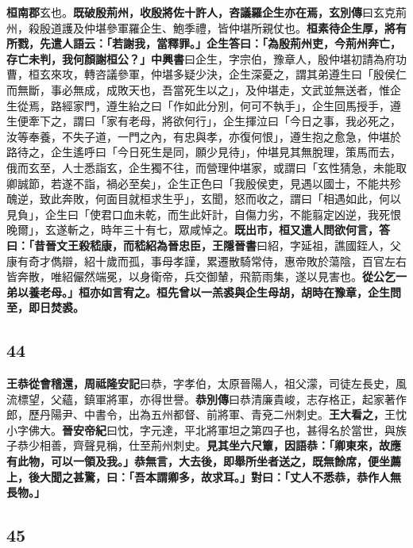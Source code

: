 \textbf{桓南郡}{\footnotesize 玄也。}\textbf{既破殷荊州，收殷將佐十許人，咨議羅企生亦在焉，}{\footnotesize \textbf{玄別傳}曰玄克荊州，殺殷道護及仲堪參軍羅企生、鮑季禮，皆仲堪所親仗也。}\textbf{桓素待企生厚，將有所戮，先遣人語云：「若謝我，當釋罪。」企生答曰：「為殷荊州吏，今荊州奔亡，存亡未判，我何顏謝桓公？」}{\footnotesize \textbf{中興書}曰企生，字宗伯，豫章人，殷仲堪初請為府功曹，桓玄來攻，轉咨議參軍，仲堪多疑少決，企生深憂之，謂其弟遵生曰「殷侯仁而無斷，事必無成，成敗天也，吾當死生以之」，及仲堪走，文武並無送者，惟企生從焉，路經家門，遵生紿之曰「作如此分別，何可不執手」，企生回馬授手，遵生便牽下之，謂曰「家有老母，將欲何行」，企生揮泣曰「今日之事，我必死之，汝等奉養，不失子道，一門之內，有忠與孝，亦復何恨」，遵生抱之愈急，仲堪於路待之，企生遙呼曰「今日死生是同，願少見待」，仲堪見其無脫理，策馬而去，俄而玄至，人士悉詣玄，企生獨不往，而營理仲堪家，或謂曰「玄性猜急，未能取卿誠節，若遂不詣，禍必至矣」，企生正色曰「我殷侯吏，見遇以國士，不能共殄醜逆，致此奔敗，何面目就桓求生乎」，玄聞，怒而收之，謂曰「相遇如此，何以見負」，企生曰「使君口血未乾，而生此奸計，自傷力劣，不能翦定凶逆，我死恨晚爾」，玄遂斬之，時年三十有七，眾咸悼之。}\textbf{既出市，桓又遣人問欲何言，答曰：「昔晉文王殺嵇康，而嵇紹為晉忠臣，}{\footnotesize \textbf{王隱晉書}曰紹，字延祖，譙國銍人，父康有奇才儁辯，紹十歲而孤，事母孝謹，累遷散騎常侍，惠帝敗於蕩陰，百官左右皆奔散，唯紹儼然端冕，以身衛帝，兵交御輦，飛箭雨集，遂以見害也。}\textbf{從公乞一弟以養老母。」桓亦如言宥之。桓先曾以一羔裘與企生母胡，胡時在豫章，企生問至，即日焚裘。}

\subsection*{44}

\textbf{王恭從會稽還，}{\footnotesize \textbf{周祗隆安記}曰恭，字孝伯，太原晉陽人，祖父濛，司徒左長史，風流標望，父蘊，鎮軍將軍，亦得世譽。\textbf{恭別傳}曰恭清廉貴峻，志存格正，起家著作郎，歷丹陽尹、中書令，出為五州都督、前將軍、青兗二州刺史。}\textbf{王大看之，}{\footnotesize 王忱小字佛大。\textbf{晉安帝紀}曰忱，字元達，平北將軍坦之第四子也，甚得名於當世，與族子恭少相善，齊聲見稱，仕至荊州刺史。}\textbf{見其坐六尺簟，因語恭：「卿東來，故應有此物，可以一領及我。」恭無言，大去後，即舉所坐者送之，既無餘席，便坐薦上，後大聞之甚驚，曰：「吾本謂卿多，故求耳。」對曰：「丈人不悉恭，恭作人無長物。」}

\subsection*{45}

